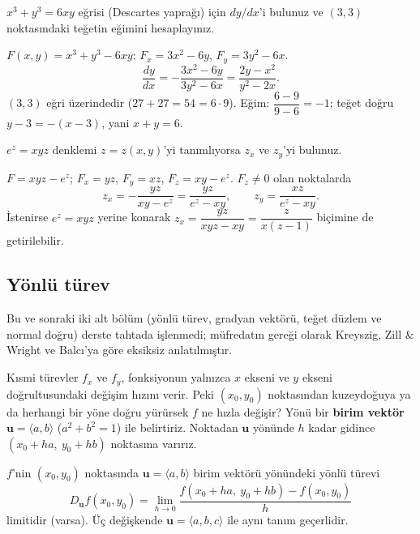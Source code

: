 \begin{soru}
$x^3+y^3=6xy$ eğrisi (Descartes yaprağı) için $dy/dx$'i bulunuz ve $(3,3)$ noktasındaki teğetin eğimini hesaplayınız.
\end{soru}
\begin{cevap}
$F(x,y)=x^3+y^3-6xy$; $F_x=3x^2-6y$, $F_y=3y^2-6x$.
\[
\frac{dy}{dx}=-\frac{3x^2-6y}{3y^2-6x}=\frac{2y-x^2}{y^2-2x}.
\]
$(3,3)$ eğri üzerindedir ($27+27=54=6\cdot9$). Eğim: $\dfrac{6-9}{9-6}=\boxed{-1}$; teğet doğru $y-3=-(x-3)$, yani $x+y=6$.
\end{cevap}

\begin{soru}
$e^{z}=xyz$ denklemi $z=z(x,y)$'yi tanımlıyorsa $z_x$ ve $z_y$'yi bulunuz.
\end{soru}
\begin{cevap}
$F=xyz-e^{z}$; $F_x=yz$, $F_y=xz$, $F_z=xy-e^{z}$. $F_z\ne0$ olan noktalarda
\[
z_x=-\frac{yz}{xy-e^{z}}=\frac{yz}{e^{z}-xy},\qquad z_y=\frac{xz}{e^{z}-xy}.
\]
İstenirse $e^{z}=xyz$ yerine konarak $z_x=\dfrac{yz}{xyz-xy}=\dfrac{z}{x(z-1)}$ biçimine de getirilebilir.
\end{cevap}

\subsection{Yönlü türev}

\begin{bilgi}
Bu ve sonraki iki alt bölüm (yönlü türev, gradyan vektörü, teğet düzlem ve normal doğru) derste tahtada işlenmedi;
müfredatın gereği olarak Kreyszig, Zill \& Wright ve Balcı'ya göre eksiksiz anlatılmıştır.
\end{bilgi}

Kısmi türevler $f_x$ ve $f_y$, fonksiyonun yalnızca $x$ ekseni ve $y$ ekseni doğrultusundaki değişim hızını verir. Peki
$(x_0,y_0)$ noktasından kuzeydoğuya ya da herhangi bir yöne doğru yürürsek $f$ ne hızla değişir? Yönü bir
\textbf{birim vektör} $\mathbf u=\langle a,b\rangle$ ($a^2+b^2=1$) ile belirtiriz. Noktadan $\mathbf u$ yönünde $h$
kadar gidince $(x_0+ha,\ y_0+hb)$ noktasına varırız.

\begin{tanim}
$f$'nin $(x_0,y_0)$ noktasında $\mathbf u=\langle a,b\rangle$ birim vektörü yönündeki yönlü türevi
\[
D_{\mathbf u}f(x_0,y_0)=\lim_{h\to0}\frac{f(x_0+ha,\ y_0+hb)-f(x_0,y_0)}{h}
\]
limitidir (varsa). Üç değişkende $\mathbf u=\langle a,b,c\rangle$ ile aynı tanım geçerlidir.
\end{tanim}

